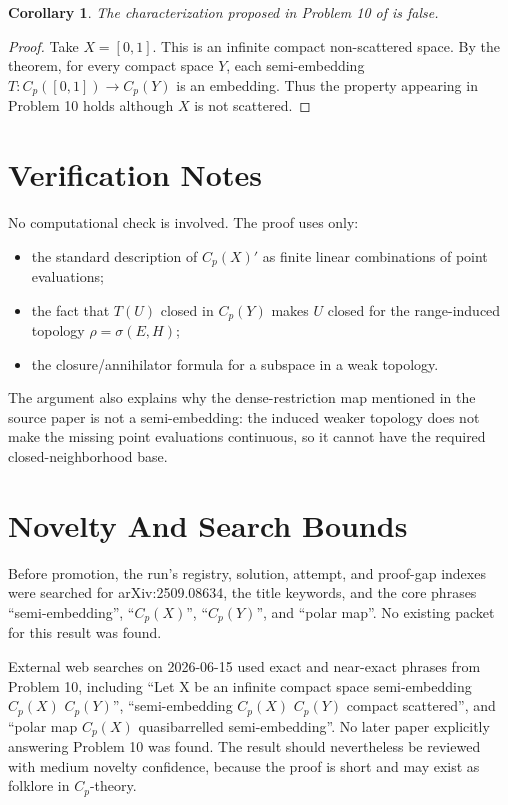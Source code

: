 \documentclass[11pt]{amsart}
\newtheorem{corollary}[theorem]{Corollary}
\newcommand{\Cp}{C_p}
\begin{document}
\begin{corollary}
The characterization proposed in Problem 10 of \cite{KKS} is false.
\end{corollary}

\begin{proof}
Take \(X=[0,1]\).  This is an infinite compact non-scattered space.  By the
theorem, for every compact space \(Y\), each semi-embedding
\(T:\Cp([0,1])\to\Cp(Y)\) is an embedding.  Thus the property appearing in
Problem 10 holds although \(X\) is not scattered.
\end{proof}

\section*{Verification Notes}

No computational check is involved.  The proof uses only:
\begin{itemize}
\item the standard description of \(\Cp(X)'\) as finite linear combinations
of point evaluations;
\item the fact that \(T(U)\) closed in \(\Cp(Y)\) makes \(U\) closed for the
range-induced topology \(\rho=\sigma(E,H)\);
\item the closure/annihilator formula for a subspace in a weak topology.
\end{itemize}

The argument also explains why the dense-restriction map mentioned in the
source paper is not a semi-embedding: the induced weaker topology does not
make the missing point evaluations continuous, so it cannot have the required
closed-neighborhood base.

\section*{Novelty And Search Bounds}

Before promotion, the run's registry, solution, attempt, and proof-gap indexes
were searched for arXiv:2509.08634, the title keywords, and the core phrases
``semi-embedding'', ``\(C_p(X)\)'', ``\(C_p(Y)\)'', and ``polar map''.  No
existing packet for this result was found.

External web searches on 2026-06-15 used exact and near-exact phrases from
Problem 10, including
``Let X be an infinite compact space semi-embedding \(C_p(X)\) \(C_p(Y)\)'',
``semi-embedding \(C_p(X)\) \(C_p(Y)\) compact scattered'', and
``polar map \(C_p(X)\) quasibarrelled semi-embedding''.  No later paper
explicitly answering Problem 10 was found.  The result should nevertheless be
reviewed with medium novelty confidence, because the proof is short and may
exist as folklore in \(C_p\)-theory.
\end{document}
